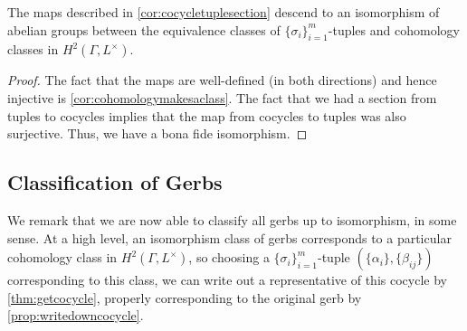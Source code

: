 \documentclass{article}
\numberwithin{equation}{section}
\begin{document}
\begin{theorem} \label{thm:classisomorphism}
	The maps described in \autoref{cor:cocycletuplesection} descend to an isomorphism of abelian groups between the equivalence classes of $\{\sigma_i\}_{i=1}^m$-tuples and cohomology classes in $H^2(\Gamma,L^\times)$.
\end{theorem}
\begin{proof}
	The fact that the maps are well-defined (in both directions) and hence injective is \autoref{cor:cohomologymakesaclass}. The fact that we had a section from tuples to cocycles implies that the map from cocycles to tuples was also surjective. Thus, we have a bona fide isomorphism.
\end{proof}

\subsection{Classification of Gerbs}
We remark that we are now able to classify all gerbs up to isomorphism, in some sense. At a high level, an isomorphism class of gerbs corresponds to a particular cohomology class in $H^2(\Gamma,L^\times)$, so choosing a $\{\sigma_i\}_{i=1}^m$-tuple $(\{\alpha_i\},\{\beta_{ij}\})$ corresponding to this class, we can write out a representative of this cocycle by \autoref{thm:getcocycle}, properly corresponding to the original gerb by \autoref{prop:writedowncocycle}.
\end{document}
